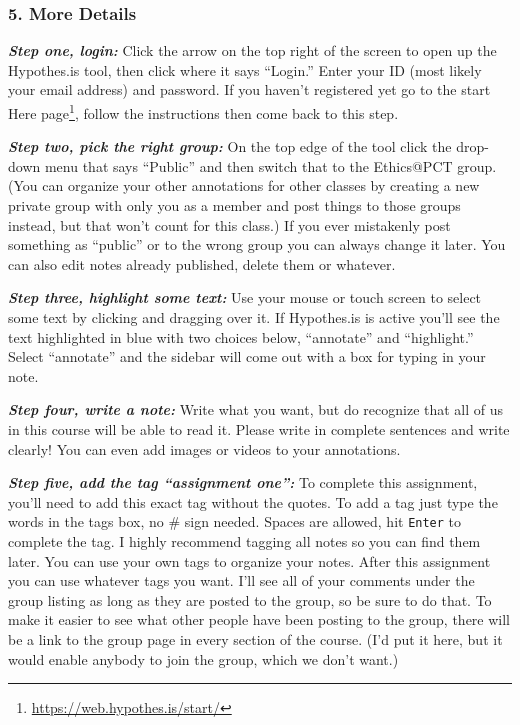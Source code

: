 \documentclass[
  12pt, openany]{book}
\renewcommand{\href}[2]{#2\footnote{\url{#1}}}
\begin{document}
\hypertarget{more-details}{%
\subsubsection{5. More Details}\label{more-details}}

\textbf{\emph{Step one, login:}} Click the arrow on the top right of the screen to open up the Hypothes.is tool, then click where it says ``Login.'' Enter your ID (most likely your email address) and password. If you haven't registered yet go to the \href{https://web.hypothes.is/start/}{start Here page}, follow the instructions then come back to this step.

\textbf{\emph{Step two, pick the right group:}} On the top edge of the tool click the drop-down menu that says ``Public'' and then switch that to the Ethics@PCT group. (You can organize your other annotations for other classes by creating a new private group with only you as a member and post things to those groups instead, but that won't count for this class.) If you ever mistakenly post something as ``public'' or to the wrong group you can always change it later. You can also edit notes already published, delete them or whatever.

\textbf{\emph{Step three, highlight some text:}} Use your mouse or touch screen to select some text by clicking and dragging over it. If Hypothes.is is active you'll see the text highlighted in blue with two choices below, ``annotate'' and ``highlight.'' Select ``annotate'' and the sidebar will come out with a box for typing in your note.

\textbf{\emph{Step four, write a note:}} Write what you want, but do recognize that all of us in this course will be able to read it. Please write in complete sentences and write clearly! You can even add images or videos to your annotations.

\textbf{\emph{Step five, add the tag ``assignment one'':}} To complete this assignment, you'll need to add this exact tag without the quotes. To add a tag just type the words in the tags box, no \# sign needed. Spaces are allowed, hit \texttt{Enter} to complete the tag. I highly recommend tagging all notes so you can find them later. You can use your own tags to organize your notes. After this assignment you can use whatever tags you want. I'll see all of your comments under the group listing as long as they are posted to the group, so be sure to do that. To make it easier to see what other people have been posting to the group, there will be a link to the group page in every section of the course. (I'd put it here, but it would enable anybody to join the group, which we don't want.)
\end{document}
